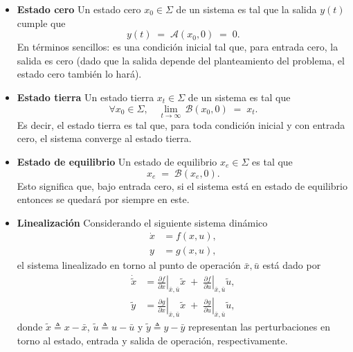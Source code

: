 \documentclass[
  11pt,
  letterpaper,
   addpoints,
  answers
  ]{exam}
\begin{document}
\begin{itemize}
  \item \textbf{Estado cero} \; Un estado cero $x_0\in\Sigma$ de un sistema es tal que la salida $y(t)$ cumple que
    \begin{equation}
      y(t) \;=\; \mathcal{A}(x_0,0)\;=\;0.
    \end{equation}
    En términos sencillos: es una condición inicial tal que, para entrada cero, la salida es cero (dado que la salida depende del planteamiento del problema, el estado cero también lo hará).

  \item \textbf{Estado tierra} \; Un estado tierra $x_t\in\Sigma$ de un sistema es tal que
    \begin{equation}
      \forall x_0\in\Sigma,\quad \lim_{t\to\infty}\, \mathcal{B}(x_0,0)\;=\;x_t.
    \end{equation}
    Es decir, el estado tierra es tal que, para toda condición inicial y con entrada cero, el sistema converge al estado tierra.

  \item \textbf{Estado de equilibrio} \; Un estado de equilibrio $x_e\in\Sigma$ es tal que
    \begin{equation}
      x_e \;=\; \mathcal{B}(x_e,0).
    \end{equation}
    Esto significa que, bajo entrada cero, si el sistema está en estado de equilibrio entonces se quedará por siempre en este.

  \item \textbf{Linealización} \; Considerando el siguiente sistema dinámico
    \begin{align}
      \dot{x} &= f(x,u), \label{eq:nonlin-x}\\
      y &= g(x,u), \label{eq:nonlin-y}
    \end{align}
    el sistema linealizado en torno al punto de operación $\bar{x},\bar{u}$ está dado por
    \begin{align}
      \dot{\tilde{x}} &= \left.\frac{\partial f}{\partial x}\right|_{\bar{x},\bar{u}} \tilde{x} \;+\;
                         \left.\frac{\partial f}{\partial u}\right|_{\bar{x},\bar{u}} \tilde{u}, \label{eq:lin-x}\\
      \tilde{y} &= \left.\frac{\partial g}{\partial x}\right|_{\bar{x},\bar{u}} \tilde{x} \;+\;
                   \left.\frac{\partial g}{\partial u}\right|_{\bar{x},\bar{u}} \tilde{u}, \label{eq:lin-y}
    \end{align}
    donde $\tilde{x}\triangleq x-\bar{x}$, $\tilde{u}\triangleq u-\bar{u}$ y $\tilde{y}\triangleq y-\bar{y}$ representan las perturbaciones en torno al estado, entrada y salida de operación, respectivamente.
\end{itemize}
\end{document}
